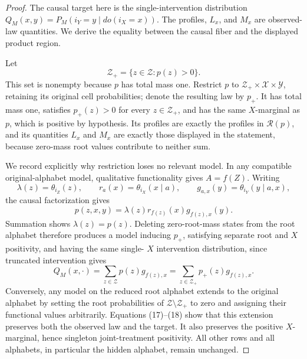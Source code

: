 \documentclass{article}
\begin{document}
\begin{proof}
The causal target here is the single-intervention distribution
\(Q_M(x,y)=P_M(i_Y=y\mid do(i_X=x))\).  The profiles, \(L_x\), and
\(M_x\) are observed-law quantities.  We derive the equality between the
causal fiber and the displayed product region.

Let
\[
 \mathcal Z_+=\{z\in\mathcal Z:p(z)>0\}.
\]
This set is nonempty because \(p\) has total mass one.  Restrict \(p\) to
\(\mathcal Z_+\times\mathcal X\times\mathcal Y\), retaining its original
cell probabilities; denote the resulting law by \(p_+\).  It has total
mass one, satisfies \(p_+(z)>0\) for every \(z\in\mathcal Z_+\), and has
the same \(X\)-marginal as \(p\), which is positive by hypothesis.  Its
profiles are exactly the profiles in \(\mathcal R(p)\), and its quantities
\(L_x\) and \(M_x\) are exactly those displayed in the statement, because
zero-mass root values contribute to neither sum.

We record explicitly why restriction loses no relevant model.  In any
compatible original-alphabet model, qualitative functionality gives
\(A=f(Z)\).  Writing
\[
 \lambda(z)=\theta_{i_Z}(z),\qquad
 r_a(x)=\theta_{i_X}(x\mid a),\qquad
 g_{a,x}(y)=\theta_{i_Y}(y\mid a,x),
\]
the causal factorization gives
\[
 p(z,x,y)=\lambda(z)r_{f(z)}(x)g_{f(z),x}(y).
\tag{17}
\]
Summation shows \(\lambda(z)=p(z)\).  Deleting zero-root-mass states from
the root alphabet therefore produces a model inducing \(p_+\), satisfying
separate root and \(X\) positivity, and having the same single-
\(X\) intervention distribution, since truncated intervention gives
\[
 Q_M(x,\cdot)=\sum_{z\in\mathcal Z}p(z)g_{f(z),x}
             =\sum_{z\in\mathcal Z_+}p_+(z)g_{f(z),x}.
\tag{18}
\]
Conversely, any model on the reduced root alphabet extends to the original
alphabet by setting the root probabilities of
\(\mathcal Z\setminus\mathcal Z_+\) to zero and assigning their functional
values arbitrarily.  Equations (17)--(18) show that this extension
preserves both the observed law and the target.  It also preserves the
positive \(X\)-marginal, hence singleton joint-treatment positivity.  All
other rows and all alphabets, in particular the hidden alphabet, remain
unchanged.


\end{proof}
\end{document}
